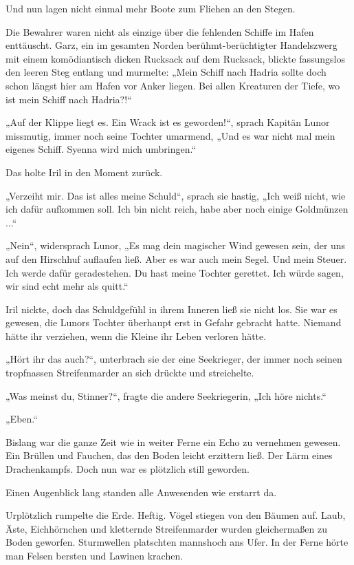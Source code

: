 Und nun lagen nicht einmal mehr Boote zum Fliehen an den Stegen.

Die Bewahrer waren nicht als einzige über die fehlenden Schiffe im Hafen enttäuscht. Garz, ein im gesamten Norden berühmt-berüchtigter Handelszwerg mit einem komödiantisch dicken Rucksack auf dem Rucksack, blickte fassungslos den leeren Steg entlang und murmelte: „Mein Schiff nach Hadria sollte doch schon längst hier am Hafen vor Anker liegen. Bei allen Kreaturen der Tiefe, wo ist mein Schiff nach Hadria?!“

„Auf der Klippe liegt es. Ein Wrack ist es geworden!“, sprach Kapitän Lunor missmutig, immer noch seine Tochter umarmend, „Und es war nicht mal mein eigenes Schiff. Syenna wird mich umbringen.“

Das holte Iril in den Moment zurück.

„Verzeiht mir. Das ist alles meine Schuld“, sprach sie hastig, „Ich weiß nicht, wie ich dafür aufkommen soll. Ich bin nicht reich, habe aber noch einige Goldmünzen ...“

„Nein“, widersprach Lunor, „Es mag dein magischer Wind gewesen sein, der uns auf den Hirschhuf auflaufen ließ. Aber es war auch mein Segel. Und mein Steuer. Ich werde dafür geradestehen. Du hast meine Tochter gerettet. Ich würde sagen, wir sind echt mehr als quitt.“

Iril nickte, doch das Schuldgefühl in ihrem Inneren ließ sie nicht los. Sie war es gewesen, die Lunors Tochter überhaupt erst in Gefahr gebracht hatte. Niemand hätte ihr verziehen, wenn die Kleine ihr Leben verloren hätte.

„Hört ihr das auch?“, unterbrach sie der eine Seekrieger, der immer noch seinen tropfnassen Streifenmarder an sich drückte und streichelte.

„Was meinst du, Stinner?“, fragte die andere Seekriegerin, „Ich höre nichts.“

„Eben.“

Bislang war die ganze Zeit wie in weiter Ferne ein Echo zu vernehmen gewesen. Ein Brüllen und Fauchen, das den Boden leicht erzittern ließ. Der Lärm eines Drachenkampfs. Doch nun war es plötzlich still geworden.

Einen Augenblick lang standen alle Anwesenden wie erstarrt da.

Urplötzlich rumpelte die Erde. Heftig. Vögel stiegen von den Bäumen auf. Laub, Äste, Eichhörnchen und kletternde Streifenmarder wurden gleichermaßen zu Boden geworfen. Sturmwellen platschten mannshoch ans Ufer. In der Ferne hörte man Felsen bersten und Lawinen krachen.

